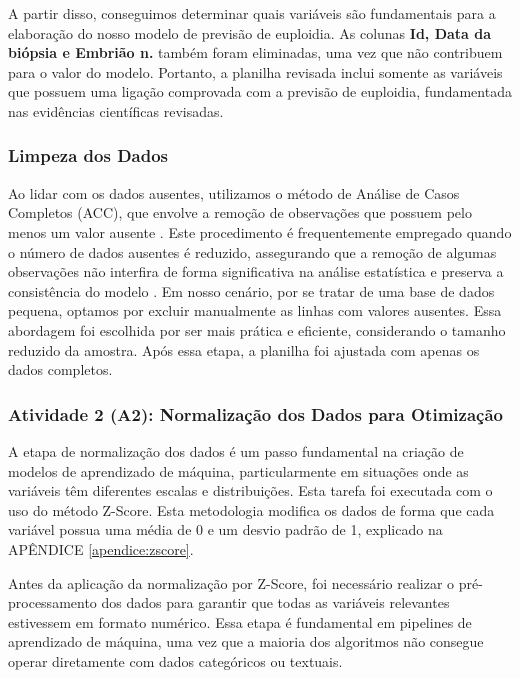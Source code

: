A partir disso, conseguimos determinar quais variáveis são fundamentais para a elaboração do nosso modelo de previsão de euploidia. As colunas \textbf{Id, Data da biópsia e Embrião n.} também foram eliminadas, uma vez que não contribuem para o valor do modelo. Portanto, a planilha revisada inclui somente as variáveis que possuem uma ligação comprovada com a previsão de euploidia, fundamentada nas evidências científicas revisadas.

\subsubsection{Limpeza dos Dados}
Ao lidar com os dados ausentes, utilizamos o método de Análise de Casos Completos (ACC), que envolve a remoção de observações que possuem pelo menos um valor ausente \cite{camargos2011}. Este procedimento é frequentemente empregado quando o número de dados ausentes é reduzido, assegurando que a remoção de algumas observações não interfira de forma significativa na análise estatística e preserva a consistência do modelo \cite{camargos2011}. Em nosso cenário, por se tratar de uma base de dados pequena, optamos por excluir manualmente as linhas com valores ausentes. Essa abordagem foi escolhida por ser mais prática e eficiente, considerando o tamanho reduzido da amostra. Após essa etapa, a planilha foi ajustada com apenas os dados completos.

\subsubsection{Atividade 2 (A2): Normalização dos Dados para Otimização}
A etapa de normalização dos dados é um passo fundamental na criação de modelos de aprendizado de máquina, particularmente em situações onde as variáveis têm diferentes escalas e distribuições. Esta tarefa foi executada com o uso do método Z-Score. Esta metodologia modifica os dados de forma que cada variável possua uma média de 0 e um desvio padrão de 1, explicado na APÊNDICE \ref{apendice:zscore}. 

Antes da aplicação da normalização por Z-Score, foi necessário realizar o pré-processamento dos dados para garantir que todas as variáveis relevantes estivessem em formato numérico. Essa etapa é fundamental em pipelines de aprendizado de máquina, uma vez que a maioria dos algoritmos não consegue operar diretamente com dados categóricos ou textuais. 

